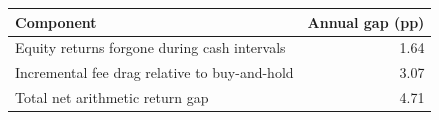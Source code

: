 \begin{tabular}{@{}lr@{}}
\toprule
Component & Annual gap (pp) \\
\midrule
Equity returns forgone during cash intervals & 1.64 \\
Incremental fee drag relative to buy-and-hold & 3.07 \\
Total net arithmetic return gap & 4.71 \\
\bottomrule
\end{tabular}
